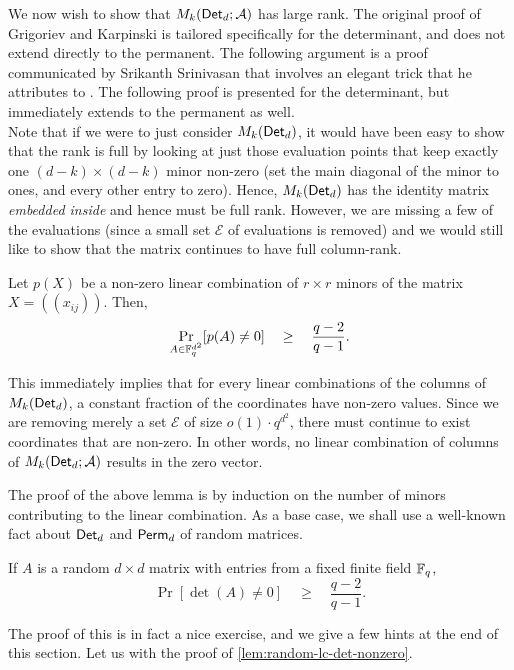 We now wish to show that $M_k(\operatorname{\mathsf{Det}}_d;\mathcal{A})$ has large rank. 
The
original proof of Grigoriev and Karpinski is tailored specifically for
the determinant, and does not extend directly to the permanent. 
The
following argument is a proof communicated by Srikanth Srinivasan
\cite{Srikanth13} that involves an elegant trick that he attributes to
\cite{Koutis08}. 
The following proof is presented for the determinant,
but immediately extends to the permanent as well. \\


Note that if we were to just consider $M_k(\operatorname{\mathsf{Det}}_d)$, it would have
been easy to show that the rank is full by looking at just those
evaluation points that keep exactly one $(d-k)\times (d-k)$ minor
non-zero (set the main diagonal of the minor to ones, and every other
entry to zero). 
Hence, $M_k(\operatorname{\mathsf{Det}}_d)$ has the identity matrix
\emph{embedded inside} and hence must be full rank. 
However, we are
missing a few of the evaluations (since a small set $\mathcal{E}$ of
evaluations is removed) and we would still like to show that the
matrix continues to have full column-rank.

\begin{lemma}\label{lem:random-lc-det-nonzero}
  Let $p(X)$ be a non-zero linear combination of $r\times r$
  minors of the matrix $X = (\!(x_{ij})\!)$. 
Then, 
  $$
  \Pr_{A\in \mathbb{F}_q^{d^2}}[p(A) \neq 0] \quad \geq \quad \frac{q-2}{q-1}.
  $$
\end{lemma}

This immediately implies that for every linear combinations of the
columns of $M_k(\operatorname{\mathsf{Det}}_d)$, a constant fraction of the coordinates have
non-zero values. 
Since we are removing merely a set $\mathcal{E}$ of
size $o(1) \cdot q^{d^2}$, there must continue to exist coordinates that
are non-zero. 
In other words, no linear combination of columns of
$M_k(\operatorname{\mathsf{Det}}_d;\mathcal{A})$ results in the zero vector.


The proof of the above lemma is by induction on the number of
minors contributing to the linear combination. 
As a base case, we
shall use a well-known fact about $\operatorname{\mathsf{Det}}_d$ and $\operatorname{\mathsf{Perm}}_d$ of random
matrices.

\begin{proposition}\label{prop:random-det-nonzero}
  If $A$ is a random $d\times d$ matrix with entries from a fixed
  finite field $\mathbb{F}_q$, 
$$
\Pr[\det(A) \neq 0] \quad\geq\quad \frac{q-2}{q-1}.
$$
\end{proposition}

The proof of this is in fact a nice exercise, and we give a few hints
at the end of this section. 
Let us with the proof of
\autoref{lem:random-lc-det-nonzero}.

